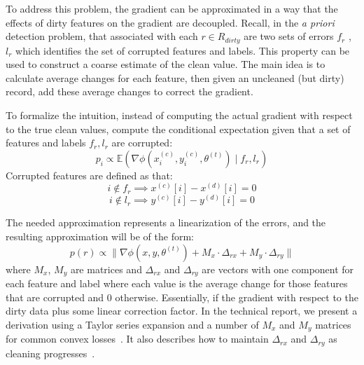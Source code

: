 To address this problem, the gradient can be approximated in a way that the effects of dirty features on the gradient are decoupled.
Recall, in the \emph{a priori} detection problem, that associated with each $r \in R_{dirty}$ are two sets of errors $f_r$ , $l_r$ which identifies the set of corrupted features and labels.
This property can be used to construct a coarse estimate of the clean value.
The main idea is to calculate average changes for each feature, then given an uncleaned (but dirty) record, add these average changes to correct the gradient.

To formalize the intuition, instead of computing the actual gradient with respect to the 
true clean values, compute the conditional expectation given that a set of features and labels $f_r,l_r$ are corrupted:
\[
p_i \propto \mathbb{E}(\nabla\phi(x^{(c)}_i,y^{(c)}_i,\theta^{(t)}) \mid f_r,l_r)
\]
Corrupted features are defined as that:
\[
i \notin f_r \implies x^{(c)}[i] - x^{(d)}[i] = 0
\]
\[
i \notin l_r \implies y^{(c)}[i] - y^{(d)}[i] = 0
\]

The needed approximation represents a linearization of the errors, and the resulting approximation will be of the form:
\[
p(r)\propto\|\nabla\phi(x,y,\theta^{(t)}) + M_x \cdot \Delta_{rx} +  M_y \cdot \Delta_{ry}\|
\]
where $M_x$, $M_y$ are matrices and $\Delta_{rx}$ and $\Delta_{ry}$ are vectors with one component for each feature and label where each value is the average change for those features that are corrupted and 0 otherwise.
Essentially, if the gradient with respect to the dirty data plus some linear correction factor.
In the technical report, we present a derivation using a Taylor series expansion and a number of $M_x$ and $M_y$ matrices for common convex losses~\cite{activecleanarxiv}.
It also describes how to maintain $\Delta_{rx}$ and $\Delta_{ry}$ as cleaning progresses~\cite{activecleanarxiv}.

\iffalse
